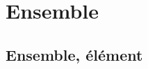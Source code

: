 \documentclass{magnolia}
\begin{document}












\section{Ensemble}
\subsection{Ensemble, élément}
\end{document}
